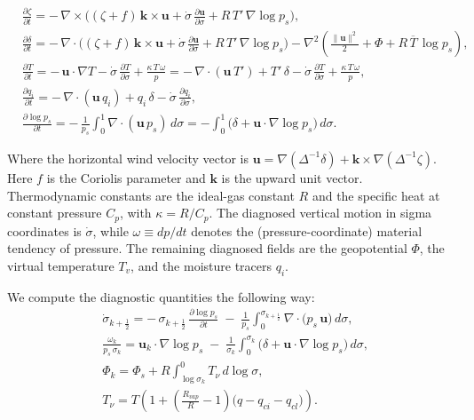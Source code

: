 \begin{equation}
    \label{eq:primitive-sigma}
    \begin{aligned}
    &\frac{\partial \zeta}{\partial t}
    = -\,\nabla \times \Big( (\zeta + f)\,\mathbf{k}\times\mathbf{u}
    + \dot{\sigma}\,\frac{\partial \mathbf{u}}{\partial \sigma}
    + R\,T'\,\nabla \log p_s \Big), \\[4pt]
    &\frac{\partial \delta}{\partial t}
    = -\,\nabla \cdot \Big( (\zeta + f)\,\mathbf{k}\times\mathbf{u}
    + \dot{\sigma}\,\frac{\partial \mathbf{u}}{\partial \sigma}
    + R\,T'\,\nabla \log p_s \Big)
    - \nabla^{2}\!\left(\frac{\|\mathbf{u}\|^{2}}{2} + \Phi + R\,\overline{T}\,\log p_s\right), \\[4pt]
    &\frac{\partial T}{\partial t}
    = -\,\mathbf{u}\cdot\nabla T - \dot{\sigma}\,\frac{\partial T}{\partial \sigma}
    + \frac{\kappa\,T\,\omega}{p} = -\,\nabla\cdot(\mathbf{u}\,T') + T'\,\delta - \dot{\sigma}\,\frac{\partial T}{\partial \sigma}
    + \frac{\kappa\,T\,\omega}{p}, \\[4pt]
    &\frac{\partial q_i}{\partial t}
    = -\,\nabla\cdot(\mathbf{u}\,q_i) + q_i\,\delta - \dot{\sigma}\,\frac{\partial q_i}{\partial \sigma}, \\[4pt]
    &\frac{\partial \log p_s}{\partial t}
    = -\,\frac{1}{p_s}\int_{0}^{1} \nabla\cdot(\mathbf{u}\,p_s)\,d\sigma
    = -\int_{0}^{1}\!\Big(\delta + \mathbf{u}\cdot\nabla \log p_s\Big)\,d\sigma.
    \end{aligned}
\end{equation}

Where the horizontal wind velocity vector is
$\mathbf{u}=\nabla(\Delta^{-1}\delta)+\mathbf{k}\times\nabla(\Delta^{-1}\zeta)$. Here $f$ is the Coriolis parameter and $\mathbf{k}$ is the upward unit vector. Thermodynamic constants are the ideal-gas constant $R$ and the specific heat at constant pressure $C_p$, with $\kappa=R/C_p$. The diagnosed vertical motion in sigma coordinates is $\dot{\sigma}$, while $\omega\equiv dp/dt$ denotes the (pressure-coordinate) material tendency of pressure. The remaining diagnosed fields are the geopotential $\Phi$, the virtual temperature $T_v$, and the moisture tracers $q_i$.

We compute the diagnostic quantities the following way:
\begin{equation}
\label{eq:diagnostics}
\begin{aligned}
&\dot{\sigma}_{k+\frac{1}{2}}
= -\,\sigma_{k+\frac{1}{2}}\,\frac{\partial \log p_s}{\partial t}
\;-\; \frac{1}{p_s}\int_{0}^{\sigma_{k+\frac{1}{2}}} \nabla\!\cdot\!\big(p_s\,\mathbf{u}\big)\,d\sigma, \\[4pt]
&\frac{\omega_k}{p_s\,\sigma_k}
= \mathbf{u}_k\!\cdot\!\nabla \log p_s
\;-\; \frac{1}{\sigma_k}\int_{0}^{\sigma_k}\!\Big(\delta + \mathbf{u}\!\cdot\!\nabla \log p_s\Big)\,d\sigma, \\[4pt]
&\Phi_k
= \Phi_s + R \int_{\log \sigma_k}^{0} T_\nu \, d\!\log \sigma, \\[4pt]
&T_\nu
= T\!\left(1 + \left(\frac{R_{vap}}{R}-1\right)\big(q - q_{ci} - q_{cl}\big)\right).
\end{aligned}
\end{equation}

